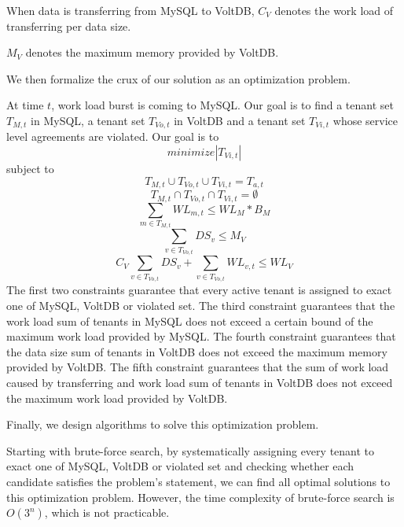 \documentclass{article}
\begin{document}
When data is transferring from MySQL to VoltDB, $C_V$ denotes the work load of transferring per data size.

$M_V$ denotes the maximum memory provided by VoltDB.

We then formalize the crux of our solution as an optimization problem.

At time $t$, work load burst is coming to MySQL. Our goal is to find a tenant set $T_{M, t}$ in MySQL, a tenant set $T_{Vo, t}$ in VoltDB and a tenant set $T_{Vi, t}$ whose service level agreements are violated. Our goal is to
\begin{equation}\label{objectivefunction}
minimize |T_{Vi ,t}|
\end{equation}
subject to
\begin{equation}\label{constraint1}
T_{M, t} \cup T_{Vo, t} \cup T_{Vi, t} = T_{a, t}
\end{equation}
\begin{equation}\label{constraint2}
T_{M, t} \cap T_{Vo, t} \cap T_{Vi, t} = \emptyset
\end{equation}
\begin{equation}\label{constraint3}
\sum_{m \in T_{M, t}}{WL_{m, t}} \leq WL_M * B_M
\end{equation}
\begin{equation}\label{constraint4}
\sum_{v \in T_{Vo, t}}{DS_v} \leq M_V
\end{equation}
\begin{equation}\label{constraint5}
C_V\sum_{v \in T_{Vo, t}}{DS_v} + \sum_{v \in T_{Vo, t}}{WL_{v, t}} \leq WL_V
\end{equation}
The first two constraints guarantee that every active tenant is assigned to exact one of MySQL, VoltDB or violated set. The third constraint guarantees that the work load sum of tenants in MySQL does not exceed a certain bound of the maximum work load provided by MySQL. The fourth constraint guarantees that the data size sum of tenants in VoltDB does not exceed the maximum memory provided by VoltDB. The fifth constraint guarantees that the sum of work load caused by transferring and work load sum of tenants in VoltDB does not exceed the maximum work load provided by VoltDB.

Finally, we design algorithms to solve this optimization problem.

Starting with brute-force search, by systematically assigning every tenant to exact one of MySQL, VoltDB or violated set and checking whether each candidate satisfies the problem's statement, we can find all optimal solutions to this optimization problem. However, the time complexity of brute-force search is $O(3^n)$, which is not practicable.
\end{document}
